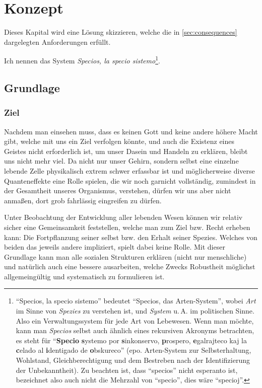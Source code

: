 \chapter{Konzept}\label{chap:concept}

Dieses Kapital wird eine Lösung skizzieren, welche die in \vref{sec:consequences} dargelegten Anforderungen erfüllt.

Ich nennen das System \textit{Specios, la specio sistemo}\footnote{"`Specios, la specio sistemo"' bedeutet "`Specios, das Arten-System"', wobei \textit{Art} im Sinne von \textit{Spezies} zu verstehen ist, und \textit{System} u.\,A. im politischen Sinne. Also ein Verwaltungssystem für jede Art von Lebewesen. Wenn man möchte, kann man \textit{Specios} selbst auch ähnlich eines rekursiven Akronyms betrachten, es steht für "`\textbf{Specio} \textbf{s}ystemo por \textbf{s}inkonservo, \textbf{p}rospero, \textbf{e}galrajteco kaj la \textbf{c}elado al \textbf{i}dentigado de \textbf{o}bskureco"' (epo. Arten-System zur Selbsterhaltung, Wohlstand, Gleichberechtigung und dem Bestreben nach der Identifizierung der Unbekanntheit). Zu beachten ist, dass "`specios"' nicht esperanto ist, bezeichnet also auch nicht die Mehrzahl von "`specio"', dies wäre "`specioj"'.}.

\section{Grundlage}\label{sec:basis}

\subsection{Ziel}\label{sec:basis/aim}

Nachdem man einsehen muss, dass es keinen Gott und keine andere höhere Macht gibt, welche mit uns ein Ziel verfolgen könnte, und auch die Existenz eines Geistes nicht erforderlich ist, um unser Dasein und Handeln zu erklären, bleibt uns nicht mehr viel. Da nicht nur unser Gehirn, sondern selbst eine einzelne lebende Zelle physikalisch extrem schwer erfassbar ist und möglicherweise diverse Quanteneffekte eine Rolle spielen, die wir noch garnicht vollständig, zumindest in der Gesamtheit unseres Organismus, verstehen, dürfen wir uns aber nicht anmaßen, dort grob fahrlässig eingreifen zu dürfen.

Unter Beobachtung der Entwicklung aller lebenden Wesen können wir relativ sicher eine Gemeinsamkeit feststellen, welche man zum Ziel bzw. Recht erheben kann: Die Fortpflanzung seiner selbst bzw. den Erhalt seiner Spezies. Welches von beiden das jeweils andere impliziert, spielt dabei keine Rolle. Mit dieser Grundlage kann man alle sozialen Strukturen erklären (nicht nur menschliche) und natürlich auch eine bessere ausarbeiten, welche Zwecks Robustheit möglichst allgemeingültig und systematisch zu formulieren ist.

